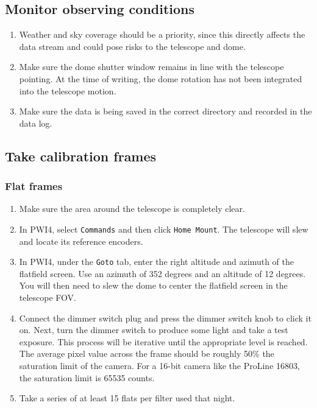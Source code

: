 \documentclass{article}
\begin{document}
	\subsection{Monitor observing conditions}
	\label{sec:monitor-observing-conditions}
	
	\begin{enumerate}
		
		\item Weather and sky coverage should be a priority, since this directly affects the data stream and could pose risks to the telescope and dome.
		
		\item Make sure the dome shutter window remains in line with the telescope pointing. At the time of writing, the dome rotation has not been integrated into the telescope motion.
		
		\item Make sure the data is being saved in the correct directory and recorded in the data log.
		
	\end{enumerate}
	
	\subsection{Take calibration frames}
	\label{sec:take-calibration-frames}
	
	\subsubsection{Flat frames}
	\label{sec:flat-frames}
	
	\begin{enumerate}
		
		\item Make sure the area around the telescope is completely clear.
		
		\item In PWI4, select \texttt{Commands} and then click \texttt{Home Mount}. The telescope will slew and locate its reference encoders.
		
		\item In PWI4, under the \texttt{Goto} tab, enter the right altitude and azimuth of the flatfield screen. Use an azimuth of 352 degrees and an altitude of 12 degrees. You will then need to slew the dome to center the flatfield screen in the telescope FOV.
		
		\item Connect the dimmer switch plug and press the dimmer switch knob to click it on. Next, turn the dimmer switch to produce some light and take a test exposure. This process will be iterative until the appropriate level is reached. The average pixel value across the frame should be roughly 50\% the saturation limit of the camera. For a 16-bit camera like the ProLine 16803, the saturation limit is 65535 counts.
		
		\item Take a series of at least 15 flats per filter used that night.
		
	\end{enumerate}
\end{document}
